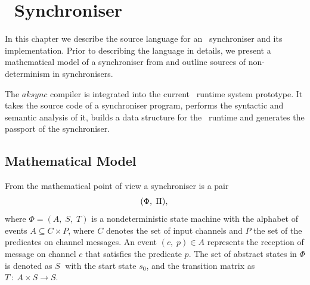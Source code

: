 \chapter{\ak\ Synchroniser}\label{chap_impl}
In this chapter we describe the source language for an \ak\ synchroniser and its implementation. Prior to describing the language in details, we present a mathematical model of a synchroniser from \cite{astrakahn} and outline sources of non-determinism in synchronisers.

The $aksync$ compiler is integrated into the current \ak\ runtime system prototype. It takes the source code of a synchroniser program, performs the syntactic and semantic analysis of it, builds a data structure for the \ak\ runtime and generates the  passport of the synchroniser.


    \section{Mathematical Model}
From the mathematical point of view a synchroniser is a pair
\begin{equation}
(\Phi, \; \Pi),\\\nonumber
\end{equation}
where $\Phi = (A, \; S, \; T)$ is a nondeterministic state machine with the alphabet of events $A \subseteq C \times P$, where $C$ denotes the set of input channels and $P$ the set of the predicates on channel messages. An event $(c, \; p) \in A$ represents the reception of message\added{ $\mu$} on channel $c$ that satisfies the predicate $p$. The set of abstract states in $\Phi$ is denoted as $S\;$ with the start state $s_{0}$, and the transition matrix as $T \: : \: A \times S \to S$.


